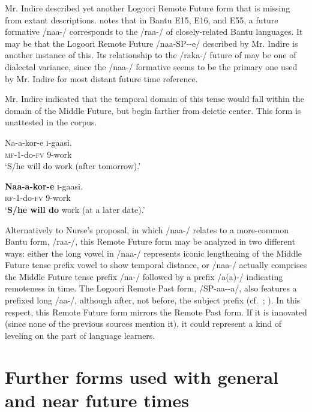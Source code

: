 \documentclass[output=paper]{langsci/langscibook}
\begin{document}
Mr. Indire described yet another Logoori Remote Future form that is missing from extant descriptions. \citet[86, fn c]{Nurse2008} notes that in Bantu E15, E16, and E55, a future formative /naa-/ corresponds to the /raa-/ of closely-related Bantu languages. It may be that the Logoori Remote Future /naa-SP-{\longrule}-e/ described by Mr. Indire is another instance of this. Its relationship to the /raka-/ future of  may be one of dialectal variance, since the /naa-/ formative seems to be the primary one used by Mr. Indire for most distant future time reference.

Mr. Indire indicated that the temporal domain of this tense would fall within the domain of the Middle Future, but begin farther from deictic center. This form is unattested in the corpus.

\ea\label{ex:sarvasy:16}
\gll Na-a-kor-e  ɪ-gaasi. \\
\textsc{mf}-1-do-\textsc{fv}  9-work \\
\glt ‘S/he will do work (after tomorrow).’
\z 

\ea\label{ex:sarvasy:17}
\gll \textbf{Naa-a-kor-e}  ɪ-gaasi. \\
\textsc{rf}-1-do-\textsc{fv}  9-work \\
\glt ‘\textbf{S/he will do} work (at a later date).’
\z

Alternatively to Nurse’s proposal, in which /naa-/ relates to a more-common Bantu form, /raa-/, this Remote Future form may be analyzed in two different ways: either the long vowel in /naa-/ represents iconic lengthening of the Middle Future tense prefix vowel to show temporal distance, or /naa-/ actually comprises the Middle Future tense prefix /na-/ followed by a prefix /a(a)-/ indicating remoteness in time. The Logoori Remote Past form, /SP-aa-{\longrule}-a/, also features a prefixed long /aa-/, although after, not before, the subject prefix (cf.\ \citealt[206]{Mould1981}; \citealt[323]{Leung1991}). In this respect, this Remote Future form mirrors the Remote Past form. If it is innovated (since none of the previous sources mention it), it could represent a kind of leveling on the part of language learners.

\section[Further forms used with general and near future times]{Further forms used with general and near future times}
\label{sec:sarvasy:7}
\end{document}
